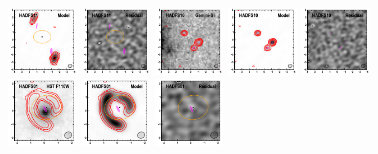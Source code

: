 \documentclass[iop]{emulateapj}
\begin{document}
\begin{figure}[!tbp]
\begin{centering}
\includegraphics[width=0.162\textwidth]{HADFS11_model_bestfit.pdf}
\includegraphics[width=0.162\textwidth]{HADFS11_residual_bestfit.pdf}
\includegraphics[width=0.162\textwidth]{HADFS10_optical_bestfit.pdf}
\includegraphics[width=0.162\textwidth]{HADFS10_model_bestfit.pdf}
\includegraphics[width=0.162\textwidth]{HADFS10_residual_bestfit.pdf}
\includegraphics[width=0.162\textwidth]{HADFS01_optical_bestfit.pdf}
\includegraphics[width=0.162\textwidth]{HADFS01_model_bestfit.pdf}
\includegraphics[width=0.162\textwidth]{HADFS01_residual_bestfit.pdf}

\end{centering}
\end{figure}
\end{document}
